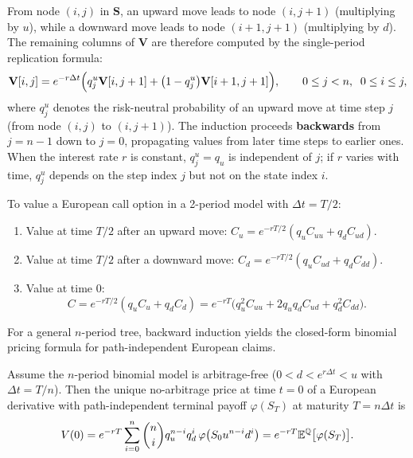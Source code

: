 From node $(i, j)$ in $\mathbf{S}$, an upward move leads to node $(i, j+1)$ (multiplying by $u$), while a downward move leads to node $(i+1, j+1)$ (multiplying by $d$). The remaining columns of $\mathbf{V}$ are therefore computed by the single-period replication formula:
\[
    \mathbf{V}[i, j] = e^{-r \Delta t} \Bigl( q_j^u \mathbf{V}[i, j+1] + \bigl(1 - q_j^u\bigr) \mathbf{V}[i+1, j+1] \Bigr), \qquad 0 \le j < n,\;\; 0 \le i \le j,
\]
where $q_j^u$ denotes the risk-neutral probability of an upward move at time step $j$ (from node $(i, j)$ to $(i, j+1)$). The induction proceeds \textbf{backwards} from $j = n - 1$ down to $j = 0$, propagating values from later time steps to earlier ones. When the interest rate $r$ is constant, $q_j^u = q_u$ is independent of $j$; if $r$ varies with time, $q_j^u$ depends on the step index $j$ but not on the state index $i$.

\begin{example}
To value a European call option in a 2-period model with $\Delta t = T/2$:
\begin{enumerate}
    \item Value at time $T/2$ after an upward move: $C_u = e^{-rT/2} (q_u C_{uu} + q_d C_{ud})$.
    \item Value at time $T/2$ after a downward move: $C_d = e^{-rT/2} (q_u C_{ud} + q_d C_{dd})$.
    \item Value at time $0$:
    \[
        C = e^{-rT/2}(q_u C_u + q_d C_d) = e^{-rT}\bigl(q_u^2 C_{uu} + 2 q_u q_d C_{ud} + q_d^2 C_{dd}\bigr).
    \]
\end{enumerate}
\end{example}

For a general $n$-period tree, backward induction yields the closed-form binomial pricing formula for path-independent European claims.

\begin{theorem}
\label{thm:multiperiod_binomial}
Assume the $n$-period binomial model is arbitrage-free ($0 < d < e^{r \Delta t} < u$ with $\Delta t = T/n$). Then the unique no-arbitrage price at time $t = 0$ of a European derivative with path-independent terminal payoff $\varphi(S_T)$ at maturity $T = n \Delta t$ is
\[
    V(0) = e^{-rT} \sum_{i=0}^{n} \binom{n}{i} q_u^{n-i} q_d^i\, \varphi\bigl(S_0 u^{n-i} d^i\bigr) = e^{-rT} \mathbb{E}^{\mathbb{Q}}\bigl[\varphi(S_T)\bigr].
\]
\end{theorem}


